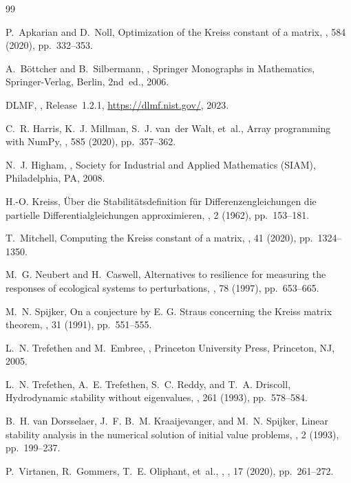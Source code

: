 \documentclass[11pt,reqno]{article}
\theoremstyle{plain}
\theoremstyle{definition}
\theoremstyle{remark}
\numberwithin{equation}{section}
\begin{document}
\begin{thebibliography}{99}

P.~Apkarian and D.~Noll,
\newblock Optimization of the {K}reiss constant of a matrix,
, 584 (2020), pp.~332--353.

A.~B{\"o}ttcher and B.~Silbermann,
,
\newblock Springer Monographs in Mathematics, Springer-Verlag, Berlin, 2nd~ed., 2006.

{DLMF},
, Release~1.2.1,
\newblock \url{https://dlmf.nist.gov/}, 2023.

C.~R. Harris, K.~J. Millman, S.~J. van~der Walt, et~al.,
\newblock Array programming with {NumPy},
, 585 (2020), pp.~357--362.

N.~J. Higham,
,
\newblock Society for Industrial and Applied Mathematics (SIAM), Philadelphia, PA, 2008.

H.-O. Kreiss,
\newblock \"{U}ber die {S}tabilit\"{a}tsdefinition f\"{u}r {D}ifferenzengleichungen die partielle {D}ifferentialgleichungen approximieren,
, 2 (1962), pp.~153--181.

T.~Mitchell,
\newblock Computing the {K}reiss constant of a matrix,
, 41 (2020), pp.~1324--1350.

M.~G. Neubert and H.~Caswell,
\newblock Alternatives to resilience for measuring the responses of ecological systems to perturbations,
, 78 (1997), pp.~653--665.

M.~N. Spijker,
\newblock On a conjecture by {E. G. Straus} concerning the {K}reiss matrix theorem,
, 31 (1991), pp.~551--555.

L.~N. Trefethen and M.~Embree,
,
\newblock Princeton University Press, Princeton, NJ, 2005.

L.~N. Trefethen, A.~E. Trefethen, S.~C. Reddy, and T.~A. Driscoll,
\newblock Hydrodynamic stability without eigenvalues,
, 261 (1993), pp.~578--584.

B.~H. van Dorsselaer, J.~F. B.~M. Kraaijevanger, and M.~N. Spijker,
\newblock Linear stability analysis in the numerical solution of initial value problems,
, 2 (1993), pp.~199--237.

P.~Virtanen, R.~Gommers, T.~E. Oliphant, et~al.,
,
, 17 (2020), pp.~261--272.

\end{thebibliography}
\end{document}
